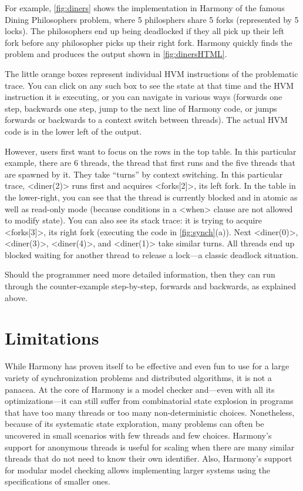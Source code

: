 \documentclass[twocolumn]{article}
\begin{document}
For example, \autoref{fig:diners} shows the implementation
in Harmony of the famous Dining Philosophers problem, where 5 philosphers
share 5 forks (represented by 5 locks).
The philosophers end up being deadlocked
if they all pick up their left fork before any philosopher picks up
their right fork.
Harmony quickly finds the problem and produces the output
shown in \autoref{fig:dinersHTML}.

The little orange boxes represent individual HVM instructions of the
problematic trace.  You can click on any such box to see the state
at that time and the HVM instruction it is executing,
or you can navigate in various ways (forwards one step,
backwards one step, jump to the next line of Harmony code, or jumps
forwards or backwards to a context switch between threads).  The actual
HVM code is in the lower left of the output.

However, users first want to focus on the rows in the top table.
In this particular example, there are 6 threads, the thread that
first runs and the five threads that are spawned by it.  They take
``turns'' by context switching.  In this particular trace, <{diner(2)}>
runs first and acquires <{forks[2]}>, its left fork.  In the table
in the lower-right, you can see that the thread is currently blocked
and in atomic as well as read-only mode (because conditions in a <{when}>
clause are not allowed to modify state).  You can also see its stack
trace: it is trying to acquire <{forks[3]}>, its right fork (executing
the code in \autoref{fig:synch}(a)).  Next <{diner(0)}>, <{diner(3)}>,
<{diner(4)}>, and <{diner(1)}> take similar turns.  All threads end up
blocked waiting for another thread to release a lock---a classic
deadlock situation.

Should the programmer need more detailed information, then they can
run through the counter-example step-by-step, forwards and backwards,
as explained above.

\section{Limitations}

While Harmony has proven itself to be effective and even fun to use
for a large variety of synchronization problems and distributed
algorithms, it is not a panacea.  At the core of Harmony is a model
checker and---even with all its optimizations---it can still suffer
from combinatorial state explosion in programs that have too many
threads or too many non-deterministic choices.  Nonetheless, because
of its systematic state exploration, many problems can often be
uncovered in small scenarios with few threads and few choices.
Harmony's support for anonymous threads is useful for scaling when
there are many similar threads that do not need to know their own
identifier.  Also, Harmony's support for modular model checking
allows implementing larger systems using the specifications of smaller ones.
\end{document}
